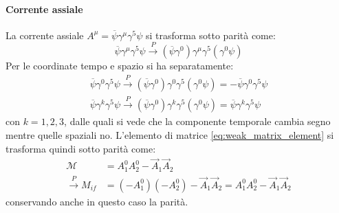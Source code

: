 \documentclass{subnucbo}
\begin{document}
\paragraph{Corrente assiale} La corrente assiale $A ^ { \mu } = \overline { \psi } \gamma ^ { \mu } \gamma ^ { 5 } \psi$ si trasforma sotto parità come:
\begin{equation}
        \overline { \psi } \gamma ^ { \mu } \gamma ^ { 5 } \psi \stackrel { P } { \rightarrow } \left( \overline { \psi } \gamma ^ { 0 } \right) \gamma ^ { \mu } \gamma ^ { 5 } \left( \gamma ^ { 0 } \psi \right)
\end{equation}
Per le coordinate tempo e spazio si ha separatamente:
\begin{equation}
        \begin{array} { l } { \overline { \psi } \gamma ^ { 0 } \gamma ^ { 5 } \psi \stackrel { P } { \rightarrow } \left( \overline { \psi } \gamma ^ { 0 } \right) \gamma ^ { 0 } \gamma ^ { 5 } \left( \gamma ^ { 0 } \psi \right) = - \overline { \psi } \gamma ^ { 0 } \gamma ^ { 5 } \psi } \\ { \overline { \psi } \gamma ^ { k } \gamma ^ { 5 } \psi \stackrel { P } { \rightarrow } \left( \overline { \psi } \gamma ^ { 0 } \right) \gamma ^ { k } \gamma ^ { 5 } \left( \gamma ^ { 0 } \psi \right) = \overline { \psi } \gamma ^ { k } \gamma ^ { 5 } \psi } \end{array}
\end{equation}
con $k=1,2,3$, dalle quali si vede che la componente temporale cambia segno mentre quelle spaziali no. L'elemento di matrice \ref{eq:weak_matrix_element} si trasforma quindi sotto parità come:
\begin{equation}
        \begin{aligned} \mathcal{M} & = A _ { 1 } ^ { 0 } A _ { 2 } ^ { 0 } - \vec { A } _ { 1 } \vec { A } _ { 2 } \\ \stackrel { P } { \rightarrow } M _ { i f } & = \left( - A _ { 1 } ^ { 0 } \right) \left( - A _ { 2 } ^ { 0 } \right) - \vec { A } _ { 1 } \vec { A } _ { 2 } = A _ { 1 } ^ { 0 } A _ { 2 } ^ { 0 } - \vec { A } _ { 1 } \vec { A } _ { 2 } \end{aligned}
\end{equation}
conservando anche in questo caso la parità.
\end{document}
